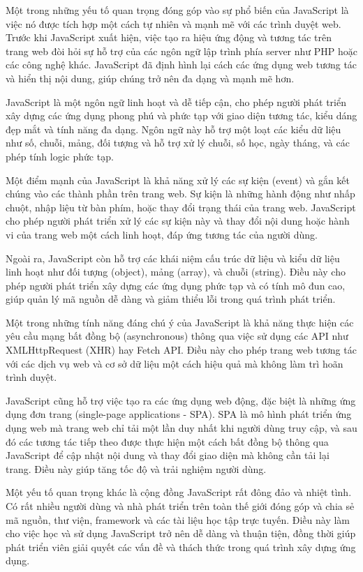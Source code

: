 Một trong những yếu tố quan trọng đóng góp vào sự phổ biến của JavaScript là việc nó được tích hợp một cách tự nhiên và mạnh mẽ với các trình duyệt web. Trước khi JavaScript xuất hiện, việc tạo ra hiệu ứng động và tương tác trên trang web đòi hỏi sự hỗ trợ của các ngôn ngữ lập trình phía server như PHP hoặc các công nghệ khác. JavaScript đã định hình lại cách các ứng dụng web tương tác và hiển thị nội dung, giúp chúng trở nên đa dạng và mạnh mẽ hơn.

JavaScript là một ngôn ngữ linh hoạt và dễ tiếp cận, cho phép người phát triển xây dựng các ứng dụng phong phú và phức tạp với giao diện tương tác, kiểu dáng đẹp mắt và tính năng đa dạng. Ngôn ngữ này hỗ trợ một loạt các kiểu dữ liệu như số, chuỗi, mảng, đối tượng và hỗ trợ xử lý chuỗi, số học, ngày tháng, và các phép tính logic phức tạp.

Một điểm mạnh của JavaScript là khả năng xử lý các sự kiện (event) và gắn kết chúng vào các thành phần trên trang web. Sự kiện là những hành động như nhấp chuột, nhập liệu từ bàn phím, hoặc thay đổi trạng thái của trang web. JavaScript cho phép người phát triển xử lý các sự kiện này và thay đổi nội dung hoặc hành vi của trang web một cách linh hoạt, đáp ứng tương tác của người dùng.

Ngoài ra, JavaScript còn hỗ trợ các khái niệm cấu trúc dữ liệu và kiểu dữ liệu linh hoạt như đối tượng (object), mảng (array), và chuỗi (string). Điều này cho phép người phát triển xây dựng các ứng dụng phức tạp và có tính mô đun cao, giúp quản lý mã nguồn dễ dàng và giảm thiểu lỗi trong quá trình phát triển.

Một trong những tính năng đáng chú ý của JavaScript là khả năng thực hiện các yêu cầu mạng bất đồng bộ (asynchronous) thông qua việc sử dụng các API như XMLHttpRequest (XHR) hay Fetch API. Điều này cho phép trang web tương tác với các dịch vụ web và cơ sở dữ liệu một cách hiệu quả mà không làm trì hoãn trình duyệt.

JavaScript cũng hỗ trợ việc tạo ra các ứng dụng web động, đặc biệt là những ứng dụng đơn trang (single-page applications - SPA). SPA là mô hình phát triển ứng dụng web mà trang web chỉ tải một lần duy nhất khi người dùng truy cập, và sau đó các tương tác tiếp theo được thực hiện một cách bất đồng bộ thông qua JavaScript để cập nhật nội dung và thay đổi giao diện mà không cần tải lại trang. Điều này giúp tăng tốc độ và trải nghiệm người dùng.

Một yếu tố quan trọng khác là cộng đồng JavaScript rất đông đảo và nhiệt tình. Có rất nhiều người dùng và nhà phát triển trên toàn thế giới đóng góp và chia sẻ mã nguồn, thư viện, framework và các tài liệu học tập trực tuyến. Điều này làm cho việc học và sử dụng JavaScript trở nên dễ dàng và thuận tiện, đồng thời giúp phát triển viên giải quyết các vấn đề và thách thức trong quá trình xây dựng ứng dụng.

